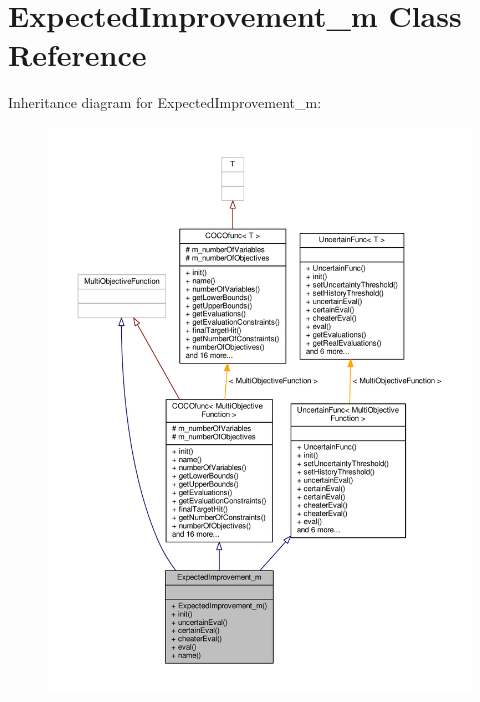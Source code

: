 \hypertarget{classExpectedImprovement__m}{}\section{Expected\+Improvement\+\_\+m Class Reference}
\label{classExpectedImprovement__m}


Inheritance diagram for Expected\+Improvement\+\_\+m\+:
\nopagebreak
\begin{figure}[H]
\begin{center}
\leavevmode
\includegraphics[width=350pt]{classExpectedImprovement__m__inherit__graph}
\end{center}
\end{figure}


